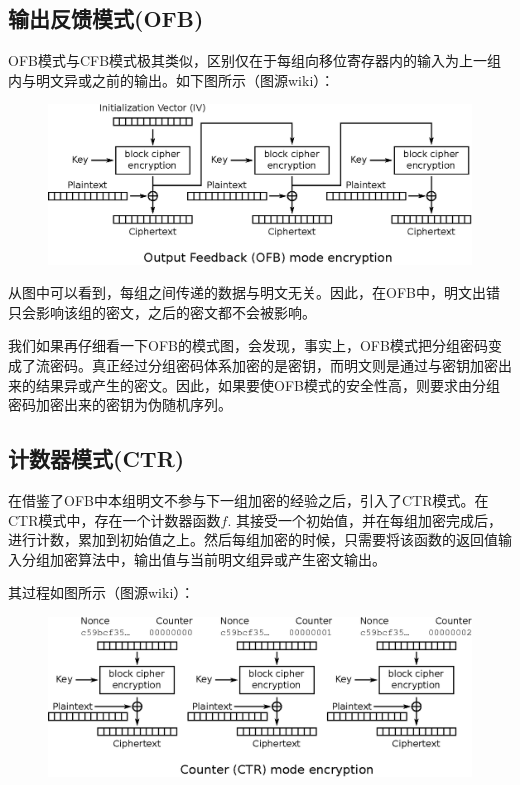 \subsection{输出反馈模式(OFB)}
OFB模式与CFB模式极其类似，区别仅在于每组向移位寄存器内的输入为上一组内与明文异或之前的输出。如下图所示（图源wiki）：
\begin{figure}[H]
\centering
\includegraphics[scale=1]{chapters/chapter_3/OFB.eps}
\end{figure}

从图中可以看到，每组之间传递的数据与明文无关。因此，在OFB中，明文出错只会影响该组的密文，之后的密文都不会被影响。\par
我们如果再仔细看一下OFB的模式图，会发现，事实上，OFB模式把分组密码变成了流密码。真正经过分组密码体系加密的是密钥，而明文则是通过与密钥加密出来的结果异或产生的密文。因此，如果要使OFB模式的安全性高，则要求由分组密码加密出来的密钥为伪随机序列。
\subsection{计数器模式(CTR)}
在借鉴了OFB中本组明文不参与下一组加密的经验之后，引入了CTR模式。在CTR模式中，存在一个计数器函数$f$. 其接受一个初始值，并在每组加密完成后，进行计数，累加到初始值之上。然后每组加密的时候，只需要将该函数的返回值输入分组加密算法中，输出值与当前明文组异或产生密文输出。\par
其过程如图所示（图源wiki）：
\begin{figure}[H]
\centering
\includegraphics[scale=1]{chapters/chapter_3/CTR.eps}
\end{figure}

